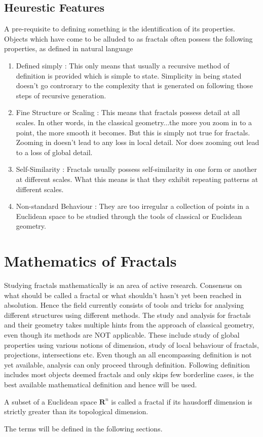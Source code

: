 \subsection{Heurestic Features}
A pre-requisite to defining something is the identification of its properties.
Objects which have come to be alluded to as fractals often possess the following
properties, as defined in natural language
\begin{enumerate}
    \item Defined simply : This only means that usually a recursive method of
        definition is provided which is simple to state. Simplicity in being
        stated doesn't go controrary to the complexity that is generated on
        following those steps of recursive generation.
    \item Fine Structure or Scaling : This means that fractals possess detail at
        all
        scales. In other words, in the classical geometry...the more you zoom in
        to a point, the more smooth it becomes. But this is simply not true for
        fractals. Zooming in doesn't lead to any loss in local detail. Nor does
        zooming out lead to a loss of global detail.
    \item Self-Similarity : Fractals usually possess self-similarity in one form
        or another at different scales. What this means is that they exhibit
        repeating patterns at different scales.
    \item Non-standard Behaviour : 
        They are too irregular a collection of points in a Euclidean space to
        be studied through the tools of classical or Euclidean geometry.
\end{enumerate}


\section{Mathematics of Fractals}
Studying fractals mathematically is an area of active research. Consensus on
what should be called a fractal or what shouldn't hasn't yet been reached in
absolution. Hence the field currently consists of tools and tricks for analysing
different structures using different methods.
\newline The study and analysis for fractals and their geometry
takes multiple hints from the
approach of classical geometry, even though its methods are NOT applicable.
These include study of global properties using various notions of dimension,
study of local behaviour of fractals, projections, intersections etc.
\newline Even though an all encompassing definition is not yet available,
analysis can only proceed through definition. Following definition includes
most
objects deemed fractals and only skips few borderline cases, is the best
available mathematical definition and hence will be used.
\begin{definition}
    A subset of a Euclidean space $\bm{R}^n$ is called a fractal if its
    hausdorff dimension is strictly greater than its topological dimension.
\end{definition}
The terms will be defined in the following sections.

